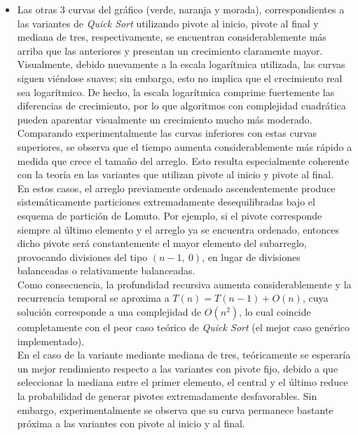 \begin{itemize}
    \item Las otras 3 curvas del gráfico (verde, naranja y morada), correspondientes a las variantes de \textit{Quick Sort} utilizando pivote al inicio, pivote 
          al final y mediana de tres, respectivamente, se encuentran considerablemente más arriba que las anteriores y presentan un crecimiento claramente mayor.  
          Visualmente, debido nuevamente a la escala logarítmica utilizada, las curvas siguen viéndose suaves; sin embargo, esto no implica que el crecimiento real 
          sea logarítmico.  De hecho, la escala logarítmica comprime fuertemente las diferencias de crecimiento, por lo que algoritmos con complejidad cuadrática 
          pueden aparentar visualmente un crecimiento mucho más moderado. \\

          Comparando experimentalmente las curvas inferiores con estas curvas superiores, se observa que el tiempo aumenta considerablemente más rápido a medida 
          que crece el tamaño del arreglo.  Esto resulta especialmente coherente con la teoría en las variantes que utilizan pivote al inicio y pivote al final. \\

          En estos casos, el arreglo previamente ordenado ascendentemente produce sistemáticamente particiones extremadamente desequilibradas bajo el esquema de 
          partición de Lomuto.  Por ejemplo, si el pivote corresponde siempre al último elemento y el arreglo ya se encuentra ordenado, entonces dicho pivote será 
          constantemente el mayor elemento del subarreglo, provocando divisiones del tipo $(n-1,\ 0)$, en lugar de divisiones balanceadas o relativamente balanceadas. \\

          Como consecuencia, la profundidad recursiva aumenta considerablemente y la recurrencia temporal se aproxima a $T(n)=T(n-1)+O(n)$, cuya solución corresponde 
          a una complejidad de $O(n^2)$, lo cual coincide completamente con el peor caso teórico de \textit{Quick Sort} (el mejor caso genérico implementado). \\

          En el caso de la variante mediante mediana de tres, teóricamente se esperaría un mejor rendimiento respecto a las variantes con pivote fijo, debido a que 
          seleccionar la mediana entre el primer elemento, el central y el último reduce la probabilidad de generar pivotes extremadamente desfavorables.  Sin embargo, 
          experimentalmente se observa que su curva permanece bastante próxima a las variantes con pivote al inicio y al final. \\


\end{itemize}
